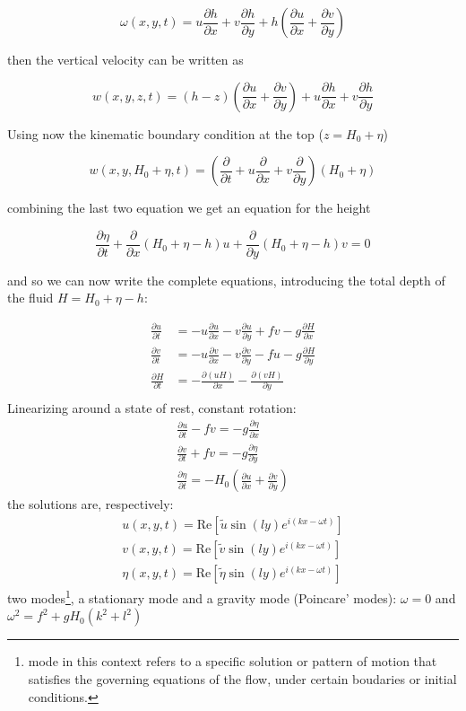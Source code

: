 \[\omega(x,y,t) = u\frac{\partial h}{\partial x} + v\frac{\partial h}{\partial y} + h \left(\frac{\partial u}{\partial x} + \frac{\partial v}{\partial y}\right)\]

then the vertical velocity can be written as

\[w(x,y,z,t) = (h-z)\left(\frac{\partial u}{\partial x} + \frac{\partial v}{\partial y}\right) + u\frac{\partial h}{\partial x} + v\frac{\partial h}{\partial y}\]

Using now the kinematic boundary condition at the top (\(z=H_0+\eta\))

\[w(x,y,H_0+\eta,t) = \left(\frac{\partial }{\partial t} + u\frac{\partial }{\partial x} + v\frac{\partial }{\partial y}\right)(H_0+\eta)\]

combining the last two equation we get an equation for the height

\[\frac{\partial \eta}{\partial t} + \frac{\partial }{\partial x}(H_0+\eta -h)u + \frac{\partial }{\partial y}(H_0+\eta -h)v = 0\]

and so we can now write the complete equations, introducing the total
depth of the fluid \(H=H_0+\eta -h\):

\[\begin{aligned}
      \frac{\partial u}{\partial t} &= -u \frac{\partial u}{\partial x} -v \frac{\partial u}{\partial y} + f v -g\frac{\partial H}{\partial x} \\
      \frac{\partial v}{\partial t} &= -u \frac{\partial v}{\partial x} -v \frac{\partial v}{\partial y} - f u -g\frac{\partial H}{\partial y}  \\
      \frac{\partial H}{\partial t} &= - \frac{\partial (u H)}{\partial x} - \frac{\partial (v H)}{\partial y} \\
\end{aligned}\]
Linearizing around a state of rest, constant rotation:
\begin{align*}
    \frac{\partial u}{\partial t}-fv=-g\frac{\partial\eta}{\partial x}\\
    \frac{\partial v}{\partial t}+fv=-g\frac{\partial\eta}{\partial y}\\
    \frac{\partial\eta}{\partial t}=-H_0\left(\frac{\partial u}{\partial x}+\frac{\partial v}{\partial y}\right)
\end{align*}
the solutions are, respectively:
\begin{align*}
    u(x,y,t)=\text{Re}\left[\tilde{u}\sin(ly)e^{i(kx-\omega t)}\right] \\
    v(x,y,t)=\text{Re}\left[\tilde{v}\sin(ly)e^{i(kx-\omega t)}\right]\\
    \eta(x,y,t)=\text{Re}\left[\tilde{\eta}\sin(ly)e^{i(kx-\omega t)}\right]
\end{align*}
two modes\footnote{mode in this context refers to a specific solution or pattern of motion that satisfies the governing equations of the flow, under certain boudaries or initial conditions.}, a stationary mode and a gravity mode (Poincare' modes): $\omega=0$ and $\omega^2=f^2+gH_0(k^2+l^2)$


